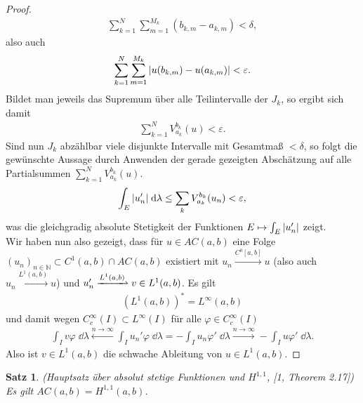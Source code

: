 \documentclass[twoside]{article}
\newcounter{lecnum}
\newtheorem{theorem}{Satz}[lecnum]
\theoremstyle{definition}
\newcommand{\N}{\mathbb{N}}
\newcommand{\lk}{\left(}
\newcommand{\rk}{\right)}
\begin{document}
\begin{proof}
{\begin{align*}
\sum_{k = 1}^N \sum_{m = 1}^{M_k} (b_{k,m} - a_{k,m}) < \delta,
\end{align*}
also auch
\begin{align*}
\sum_{k = 1}^N \sum_{m = 1}^{M_k} \abs{u(b_{k,m}) - u(a_{k,m})} < \varepsilon.
\end{align*}
Bildet man jeweils das Supremum über alle Teilintervalle der $J_k$, so ergibt sich damit
\begin{align*}
\sum_{k = 1}^N V^{b_k}_{a_k}(u) < \varepsilon.
\end{align*}
Sind nun $J_k$ abzählbar viele disjunkte Intervalle mit Gesamtmaß $< \delta$, so folgt die gewünschte Aussage durch Anwenden der gerade gezeigten Abschätzung auf alle Partialsummen $\sum_{k = 1}^N V^{b_k}_{a_k}(u)$.
}
\begin{align*}
\int_E \abs{u_n'} \; \dd \lambda \leq \sum_k V_{a_k}^{b_k}(u_n) < \varepsilon,
\end{align*}
was die gleichgradig absolute Stetigkeit der Funktionen $E \mapsto \int_E \abs{u_n'}$ zeigt.\\

Wir haben nun also gezeigt, dass für $u \in AC(a,b)$ eine Folge $(u_n)_{n \in \N} \subset C^1(a,b) \cap AC(a,b)$ existiert mit $u_n \xrightarrow{C^0[a,b]} u$ (also auch $u_n \xrightarrow{L^1(a,b)} u$) und $u_n' \xrightharpoonup{L^1(a,b)} v \in L^1(a,b)$. Es gilt 
\begin{align*}
\lk L^1(a,b) \rk^* = L^\infty(a,b)
\end{align*}
und damit wegen $C^\infty_c(I) \subset L^\infty(I)$ für alle $\varphi \in C^\infty_c(I)$
\begin{align*}
\int_I v \varphi \; \dd \lambda \xleftarrow{n \to \infty} \int_I u_n' \varphi \; \dd \lambda = - \int_I u_n \varphi' \; \dd \lambda\xrightarrow{n \to \infty} -\int_I u \varphi' \; \dd \lambda.
\end{align*}
Also ist $v \in L^1(a,b)$ die schwache Ableitung von $u \in L^1(a,b)$.
\end{proof}
\newpage
\begin{theorem} (Hauptsatz über absolut stetige Funktionen und $H^{1,1}$, [1, Theorem 2.17]) \label{thm:ach}\\
Es gilt $AC(a,b) = H^{1,1}(a,b)$.
\end{theorem}
\end{document}
